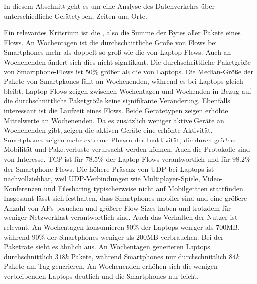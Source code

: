 \documentclass[12pt, a4paper]{article}
\begin{document}
In diesem Abschnitt geht es um eine Analyse des Datenverkehrs über unterschiedliche Gerätetypen, Zeiten und Orte.

Ein relevantes Kriterium ist die , also die Summe der Bytes aller Pakete eines Flows.
An Wochentagen ist die durchschnittliche Größe von Flows bei Smartphones mehr als doppelt so groß wie die von Laptop-Flows.
Auch an Wochenenden ändert sich dies nicht signifikant.
Die durchschnittliche Paketgröße von Smartphone-Flows ist $50 \%$ größer als die von Laptops.
Die Median-Größe der Pakete von Smartphones fällt an Wochenenden, während es bei Laptops gleich bleibt.
Laptop-Flows zeigen zwischen Wochentagen und Wochenden in Bezug auf die durchschnittliche Paketgröße keine signifikante Veränderung.
\newline\newline
Ebenfalls interessant ist die Laufzeit eines Flows. Beide Gerätetypen zeigen erhöhte Mittelwerte an Wochenenden.
Da es zusätzlich weniger aktive Geräte an Wochenenden gibt, zeigen die aktiven Geräte eine erhöhte Aktivität.
\newline\newline
Smartphones zeigen mehr extreme Phasen der Inaktivität, die durch größere Mobilität und Paketverluste verursacht werden können.
\newline\newline
Auch die Protokolle sind von Interesse. TCP ist für $78.5 \%$ der Laptop Flows verantwortlich
und für $98.2 \%$ der Smartphone Flows. Die höhere Präsenz von UDP bei Laptops ist nachvollziehbar, weil
UDP-Verbindungen wie Multiplayer-Spiele, Video-Konferenzen und Filesharing typischerweise nicht auf Mobilgeräten stattfinden.
\newline\newline
Insgesamt lässt sich festhalten, dass Smartphones mobiler sind und eine größere Anzahl von APs besuchen
und größere Flow-Sizes haben und trotzdem für weniger Netzwerklast verantwortlich sind.
\newline\newline
Auch das Verhalten der Nutzer ist relevant. An Wochentagen konsumieren $90 \%$ der Laptops weniger als $700$\textsc{MB},
während $90 \%$ der Smartphones weniger als $200$\textsc{MB} verbrauchen.
Bei der Paketrate sieht es ähnlich aus. An Wochentagen generieren Laptops durchschnittlich $318k$ Pakete, während
Smartphones nur durchschnittlich $84k$ Pakete am Tag generieren. An Wochenenden erhöhen sich die wenigen verbleibenden
Laptops deutlich und die Smartphones nur leicht.
\end{document}
